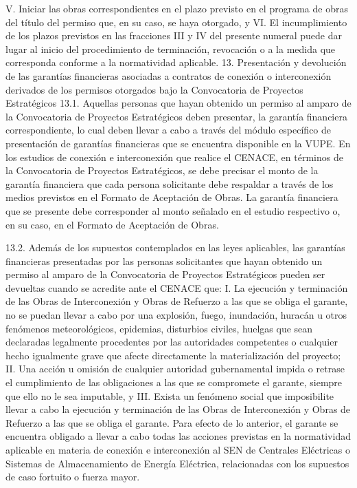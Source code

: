 V. Iniciar las obras correspondientes en el plazo previsto en el programa de obras del título del permiso que, en su caso, se haya otorgado, y
VI. El incumplimiento de los plazos previstos en las fracciones III y IV del presente numeral puede dar lugar al inicio del procedimiento de terminación, revocación o a la medida que corresponda conforme a la normatividad aplicable.
13. Presentación y devolución de las garantías financieras asociadas a contratos de conexión o interconexión derivados de los permisos otorgados bajo la Convocatoria de Proyectos Estratégicos
13.1. Aquellas personas que hayan obtenido un permiso al amparo de la Convocatoria de Proyectos Estratégicos deben presentar, la garantía financiera correspondiente, lo cual deben llevar a cabo a través del módulo específico de presentación de garantías financieras que se encuentra disponible en la VUPE.
En los estudios de conexión e interconexión que realice el CENACE, en términos de la Convocatoria de Proyectos Estratégicos, se debe precisar el monto de la garantía financiera que cada persona solicitante debe respaldar a través de los medios previstos en el Formato de Aceptación de Obras. La garantía financiera que se presente debe corresponder al monto señalado en el estudio respectivo o, en su caso, en el Formato de Aceptación de Obras.\par
13.2. Además de los supuestos contemplados en las leyes aplicables, las garantías financieras presentadas por las personas solicitantes que hayan obtenido un permiso al amparo de la Convocatoria de Proyectos Estratégicos pueden ser devueltas cuando se acredite ante el CENACE que:
I. La ejecución y terminación de las Obras de Interconexión y Obras de Refuerzo a las que se obliga el garante, no se puedan llevar a cabo por una explosión, fuego, inundación, huracán u otros fenómenos meteorológicos, epidemias, disturbios civiles, huelgas que sean declaradas legalmente procedentes por las autoridades competentes o cualquier hecho igualmente grave que afecte directamente la materialización del proyecto;
II. Una acción u omisión de cualquier autoridad gubernamental impida o retrase el cumplimiento de las obligaciones a las que se compromete el garante, siempre que ello no le sea imputable, y
III. Exista un fenómeno social que imposibilite llevar a cabo la ejecución y terminación de las Obras de Interconexión y Obras de Refuerzo a las que se obliga el garante.
Para efecto de lo anterior, el garante se encuentra obligado a llevar a cabo todas las acciones previstas en la normatividad aplicable en materia de conexión e interconexión al SEN de Centrales Eléctricas o Sistemas de Almacenamiento de Energía Eléctrica, relacionadas con los supuestos de caso fortuito o fuerza mayor.
